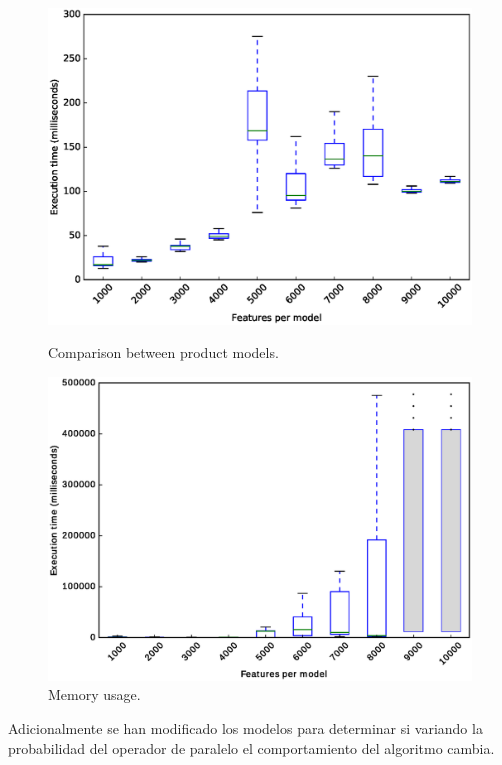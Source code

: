 \begin{figure}[h]
	\centering
	\begin{minipage}[b]{0.48\textwidth}
		\includegraphics[width=\textwidth]{boxplot_0_1.eps}
		\caption{Comparison between product models.}\label{fig:plot:probs:boxplot_0_1}
	\end{minipage}
	\hfill
	\begin{minipage}[b]{0.48\textwidth}
		\includegraphics[width=\textwidth]{boxplot_0_5.eps}
		\caption{Memory usage.}\label{fig:plot:probs:boxplot_0_5}
	\end{minipage}
\end{figure}


Adicionalmente se han modificado los modelos para
determinar si variando la probabilidad del
operador de paralelo el comportamiento del
algoritmo cambia.

